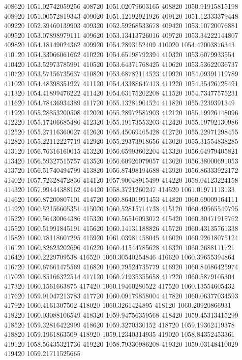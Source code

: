 {408620 1051.02742059256
408720 1051.02079603165
408820 1050.91915815198
408920 1051.00572819343
409020 1051.12192921926
409120 1051.12333379448
409220 1052.39460139903
409320 1052.59268533678
409420 1053.10720076881
409520 1053.07898979111
409620 1053.13413726016
409720 1053.34222144807
409820 1054.18149024362
409920 1054.2893152409
410020 1054.42003876343
410120 1054.33066061662
410220 1054.65198792394
410320 1053.6079933554
410420 1053.52973785991
410520 1053.64371768425
410620 1053.53622036737
410720 1053.57156735637
410820 1053.68782114523
410920 1054.09391119789
411020 1054.48398351927
411120 1054.43388647413
411220 1054.35426725491
411320 1054.41899476222
411420 1054.63175202208
411520 1054.73477575231
411620 1054.78436934389
411720 1055.13281904524
411820 1055.2239391349
411920 1055.28853200508
412020 1055.28972587903
412120 1055.19926148096
412220 1055.17406685486
412320 1055.19173553203
412420 1055.19792130986
412520 1055.27116360027
412620 1055.45069465428
412720 1055.22971298455
412820 1055.22112227719
412920 1055.29373918656
413020 1055.31554838285
413120 1056.76316160015
413220 1056.65993602204
413320 1056.64979405821
413420 1056.59327515757
413520 1056.60926079057
413620 1056.38000691053
413720 1056.51740494799
413820 1056.87498194688
413920 1056.86333922172
414020 1057.72328472836
414120 1057.90048915499
414220 1058.04123224158
414320 1057.99444388162
414420 1058.3721260247
414520 1061.01971113133
414620 1060.87200807101
414720 1060.86401991453
414820 1060.69009164111
414920 1060.52156605351
415020 1060.52815714738
415120 1060.49565549795
415220 1060.56430064386
415320 1060.56516093072
415420 1060.30471915762
415520 1060.51991845191
415620 1060.14131188826
415720 1060.43135761338
415820 1060.78118607295
415920 1061.03981458045
416020 1060.92618075124
416120 1060.82623202696
416220 1060.41544785628
416320 1060.2688111721
416420 1060.2229709538
416520 1060.30540254846
416620 1060.39655394864
416720 1060.67661475569
416820 1060.79524735779
416920 1060.84686425974
417020 1060.85166322514
417120 1060.71935355658
417220 1060.5879105304
417320 1060.1561663875
417420 1060.19460280522
417520 1060.13554605432
417620 1059.91047213783
417720 1060.09179858004
417820 1060.06377034593
417920 1060.4161307502
418020 1060.3261424895
418120 1060.20920866931
418220 1060.03088106549
418320 1059.94756359568
418420 1059.45313415299
418520 1059.32816422999
418620 1059.3270330152
418720 1059.19362419378
418820 1059.1961863509
418920 1059.12340314935
419020 1058.84352453361
419120 1058.56435321736
419220 1058.79330986208
419320 1059.03148410029
419420 1059.21711525665
}
